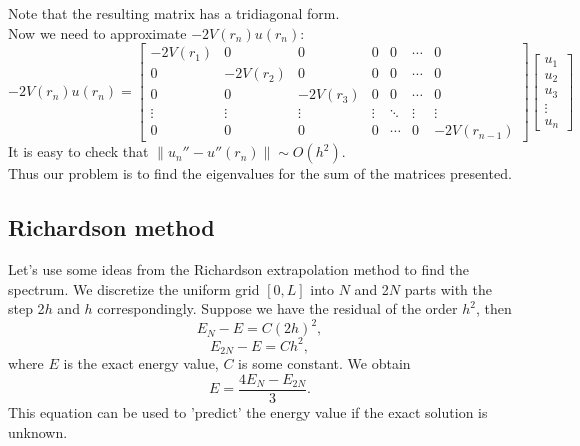 \documentclass[a4paper, 11pt]{article}
\begin{document}
Note that the resulting matrix has a tridiagonal form.\\
Now we need to approximate $-2V(r_n)u(r_n)$:
$$-2V(r_n)u(r_n) = \begin{bmatrix}
-2V(r_1) & 0 &0&0&0& \cdots & 0 \\
0 & -2V(r_2) & 0& 0&0&\cdots & 0 \\  
0&0 & -2V(r_3) & 0& 0&\cdots & 0 \\  
\vdots & \vdots &\vdots & \vdots & \ddots & \vdots& \vdots  \\
0 & 0&0 &0& \cdots &0 & -2V(r_{n-1})
\end{bmatrix}
\begin{bmatrix}
u_1
\\
u_2
\\
u_3
\\
\vdots
\\
u_n
\end{bmatrix}$$
It is easy to check that $\displaystyle{\| u_n''-u''(r_n) \| \sim O(h^2)}.$\\
Thus our problem is to find the eigenvalues for the sum of the matrices presented.

\subsection{Richardson method}
Let's use some ideas from the Richardson extrapolation method to find the spectrum. We discretize the uniform grid $[0, L]$ into $N$ and 2$N$ parts with the step 2$h$ and $h$ correspondingly. Suppose we have the residual of the order $h^2$, then 
$$E_{N} - E = C (2h)^2,$$
$$E_{2N} - E = C h^2,$$
where $E$ is the exact energy value, $C$ is some constant. We obtain 
\begin{equation}
	E = \frac{4 E_N - E_{2N}}{3}.
\end{equation}
This equation can be used to 'predict' the energy value if the exact solution is unknown.
\end{document}
